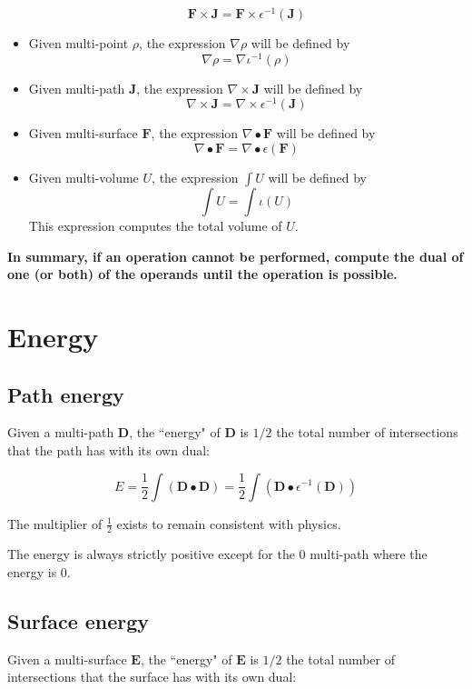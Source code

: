 \begin{itemize}
\[\mathbf{F} \times \mathbf{J} = \mathbf{F} \times \epsilon^{-1}(\mathbf{J})\]
\item Given multi-point \(\rho\), the expression \(\nabla \rho\) will be defined by 
\[\nabla \rho = \nabla \iota^{-1}(\rho)\]
\item Given multi-path \(\mathbf{J}\), the expression \(\nabla \times \mathbf{J}\) will be defined by 
\[\nabla \times \mathbf{J} = \nabla \times \epsilon^{-1}(\mathbf{J})\]
\item Given multi-surface \(\mathbf{F}\), the expression \(\nabla \bullet \mathbf{F}\) will be defined by 
\[\nabla \bullet \mathbf{F} = \nabla \bullet \epsilon(\mathbf{F})\]
\item Given multi-volume \(U\), the expression \(\int U\) will be defined by
\[\int U = \int \iota(U)\]
This expression computes the total volume of \(U\).
\end{itemize}

{\bf In summary, if an operation cannot be performed, compute the dual of one (or both) of the operands until the operation is possible.}


\section{Energy}

\subsection{Path energy}

Given a multi-path \(\mathbf{D}\), the ``energy" of \(\mathbf{D}\) is \(1/2\) the total number of intersections that the path has with its own dual:

\[E = \frac{1}{2}\int (\mathbf{D} \bullet \mathbf{D}) = \frac{1}{2}\int (\mathbf{D} \bullet \epsilon^{-1}(\mathbf{D}))\]

The multiplier of \(\frac{1}{2}\) exists to remain consistent with physics.

The energy is always strictly positive except for the \(0\) multi-path where the energy is \(0\).


\subsection{Surface energy}

Given a multi-surface \(\mathbf{E}\), the ``energy" of \(\mathbf{E}\) is \(1/2\) the total number of intersections that the surface has with its own dual:

